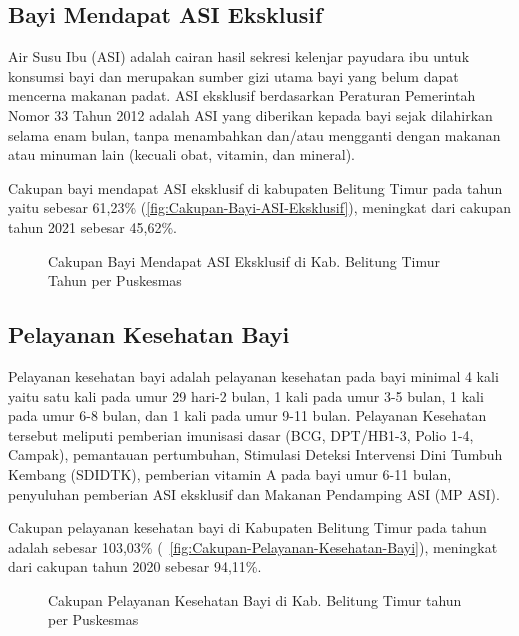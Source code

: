 \subsection{Bayi Mendapat ASI Eksklusif}
Air Susu Ibu (ASI) adalah cairan hasil sekresi kelenjar payudara ibu
untuk konsumsi bayi dan merupakan sumber gizi utama bayi yang belum
dapat mencerna makanan padat. ASI eksklusif berdasarkan Peraturan
Pemerintah Nomor 33 Tahun 2012 adalah ASI yang diberikan kepada bayi
sejak dilahirkan selama enam bulan, tanpa menambahkan dan/atau mengganti
dengan makanan atau minuman lain (kecuali obat, vitamin, dan mineral).

Cakupan bayi mendapat ASI eksklusif di kabupaten Belitung Timur pada
tahun \tP yaitu sebesar 61,23\% (\autoref{fig:Cakupan-Bayi-ASI-Eksklusif}), meningkat dari cakupan tahun 2021 sebesar 45,62\%.

\begin{figure}[H]
  \centering
  \caption{Cakupan Bayi Mendapat ASI Eksklusif di Kab. Belitung Timur Tahun \tP per Puskesmas}
  \label{fig:Cakupan-Bayi-ASI-Eksklusif}
\end{figure}

\subsection{Pelayanan Kesehatan Bayi}
Pelayanan kesehatan bayi adalah pelayanan kesehatan pada bayi minimal
4 kali yaitu satu kali pada umur 29 hari-2 bulan, 1 kali pada umur
3-5 bulan, 1 kali pada umur 6-8 bulan, dan 1 kali pada umur 9-11 bulan.
Pelayanan Kesehatan tersebut meliputi pemberian imunisasi dasar (BCG,
DPT/HB1-3, Polio 1-4, Campak), pemantauan pertumbuhan, Stimulasi Deteksi
Intervensi Dini Tumbuh Kembang (SDIDTK), pemberian vitamin A pada
bayi umur 6-11 bulan, penyuluhan pemberian ASI eksklusif dan Makanan
Pendamping ASI (MP ASI).

Cakupan pelayanan kesehatan bayi di Kabupaten Belitung Timur pada
tahun \tP adalah sebesar 103,03\% (~\autoref{fig:Cakupan-Pelayanan-Kesehatan-Bayi}), meningkat dari cakupan tahun 2020
sebesar 94,11\%.

\begin{figure}[H]
    \centering
    \caption{Cakupan Pelayanan Kesehatan Bayi di Kab. Belitung Timur tahun \tP per Puskesmas}
    \label{fig:Cakupan-Pelayanan-Kesehatan-Bayi}
\end{figure}

